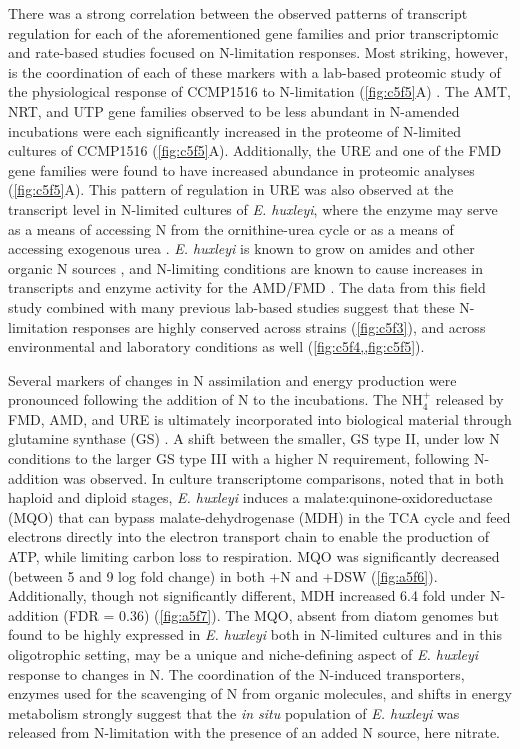 There was a strong correlation between the observed patterns of transcript regulation for each of the aforementioned gene families and prior transcriptomic \citep{Rokitta2014} and rate-based \citep{Palenik1997, Bruhn2010} studies focused on N-limitation responses. Most striking, however, is the coordination of each of these markers with a lab-based proteomic study of the physiological response of CCMP1516 to N-limitation (\cref{fig:c5f5}A) \citep{McKew2015}. The AMT, NRT, and UTP gene families observed to be less abundant in N-amended incubations were each significantly increased in the proteome of N-limited cultures of CCMP1516 (\cref{fig:c5f5}A).  Additionally, the URE and one of the FMD gene families were found to have increased abundance in proteomic analyses (\cref{fig:c5f5}A). This pattern of regulation in URE was also observed at the transcript level in N-limited cultures of \textit{E. huxleyi}, where the enzyme may serve as a means of accessing N from the ornithine-urea cycle \citep{Rokitta2014} or as a means of accessing exogenous urea \citep{Dyhrman2003a}. \textit{E. huxleyi} is known to grow on amides and other organic N sources \citep{Palenik1997}, and N-limiting conditions are known to cause increases in transcripts and enzyme activity for the AMD/FMD \citep{Bruhn2010, Palenik1997}. The data from this field study combined with many previous lab-based studies suggest that these N-limitation responses are highly conserved across strains (\cref{fig:c5f3}), and across environmental and laboratory conditions as well (\cref{fig:c5f4,,fig:c5f5}).\par


Several markers of changes in N assimilation and energy production were pronounced following the addition of N to the incubations. The NH$_{4}^+$ released by FMD, AMD, and URE is ultimately incorporated into biological material through glutamine synthase (GS) \citep{Rokitta2014}. A shift between the smaller, GS type II, under low N conditions to the larger GS type III with a higher N requirement, following N-addition was observed. In culture transcriptome comparisons, \citet{Rokitta2014} noted that in both haploid and diploid stages, \textit{E. huxleyi} induces a malate:quinone-oxidoreductase (MQO) that can bypass malate-dehydrogenase (MDH) in the TCA cycle and feed electrons directly into the electron transport chain to enable the production of ATP, while limiting carbon loss to respiration. MQO was significantly decreased (between 5 and 9 log fold change) in both +N and +DSW (\cref{fig:a5f6}). Additionally, though not significantly different, MDH increased 6.4 fold under N-addition (FDR = 0.36) (\cref{fig:a5f7}). The MQO, absent from diatom genomes but found to be highly expressed in \textit{E. huxleyi} both in N-limited cultures and in this oligotrophic setting, may be a unique and niche-defining aspect of \textit{E. huxleyi} response to changes in N. The coordination of the N-induced transporters, enzymes used for the scavenging of N from organic molecules, and shifts in energy metabolism strongly suggest that the \textit{in situ} population of \textit{E. huxleyi} was released from N-limitation with the presence of an added N source, here nitrate.\par

